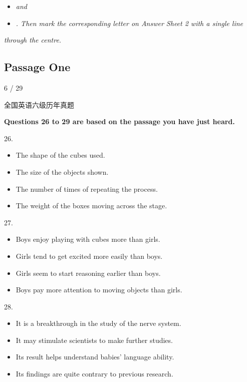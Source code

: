 \documentclass[UTF8,11pt]{ctexart}
\begin{document}
\begin{itemize}[leftmargin=2em,itemsep=.2em,topsep=.4em]\item[C.] \textit{and}
\item[D.] \textit{. Then mark the corresponding letter on Answer Sheet 2 with a single line}
\end{itemize}

\textit{through the centre.}


\subsection*{\textbf{Passage One}}


6 / 29


全国英语六级历年真题


\textbf{Questions 26 to 29 are based on the passage you have just heard.}


26.


\begin{itemize}[leftmargin=2em,itemsep=.2em,topsep=.4em]\item[A.] The shape of the cubes used.
\item[B.] The size of the objects shown.
\item[C.] The number of times of repeating the process.
\item[D.] The weight of the boxes moving across the stage.
\end{itemize}

27.


\begin{itemize}[leftmargin=2em,itemsep=.2em,topsep=.4em]\item[A.] Boys enjoy playing with cubes more than girls.
\item[B.] Girls tend to get excited more easily than boys.
\item[C.] Girls seem to start reasoning earlier than boys.
\item[D.] Boys pay more attention to moving objects than girls.
\end{itemize}

28.


\begin{itemize}[leftmargin=2em,itemsep=.2em,topsep=.4em]\item[A.] It is a breakthrough in the study of the nerve system.
\item[B.] It may stimulate scientists to make further studies.
\item[C.] Its result helps understand babies' language ability.
\item[D.] Its findings are quite contrary to previous research.
\end{itemize}
\end{document}
